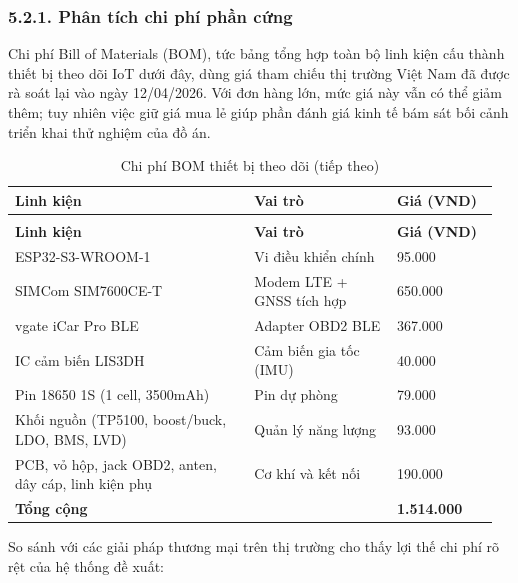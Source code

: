 \documentclass[a4paper]{extarticle}
\newcommand{\thesissettableid}[2]{%
  \renewcommand{\thetable}{#1}%
  \renewcommand{\theHtable}{#2}%
}
\begin{document}
\subsubsection{5.2.1. Phân tích chi phí phần
cứng}\label{521-phuxe2n-tuxedch-chi-phuxed-phux1ea7n-cux1ee9ng}

Chi phí Bill of Materials (BOM), tức bảng tổng hợp toàn bộ linh kiện cấu
thành thiết bị theo dõi IoT dưới đây, dùng
giá tham chiếu thị trường Việt Nam đã được rà soát lại vào ngày
12/04/2026. Với đơn hàng lớn, mức giá này vẫn có thể giảm thêm; tuy
nhiên việc giữ giá mua lẻ giúp phần đánh giá kinh tế bám sát bối cảnh
triển khai thử nghiệm của đồ án.


{\thesissettableid{5.4}{tab-ch5-chi-phi-bom-thiet-bi-tracker}
\def\LTcaptype{table}
\begin{longtable}{|L{0.479\linewidth}|L{0.282\linewidth}|L{0.204\linewidth}|}
\caption{Chi phí BOM thiết bị theo dõi}\label{tab:ch5-chi-phi-bom-thiet-bi-tracker}\\
\hline \textbf{Linh kiện} & \textbf{Vai trò} & \textbf{Giá (VND)} \\
\hline
\endfirsthead
\caption[]{Chi phí BOM thiết bị theo dõi (tiếp theo)}\\
\hline \textbf{Linh kiện} & \textbf{Vai trò} & \textbf{Giá (VND)} \\
\hline
\endhead
\hline
\endfoot
\endlastfoot
ESP32-S3-WROOM-1 & Vi điều khiển chính & 95.000 \\\hline
SIMCom SIM7600CE-T & Modem LTE + GNSS tích hợp & 650.000 \\\hline
vgate iCar Pro BLE & Adapter OBD2 BLE & 367.000 \\\hline
IC cảm biến LIS3DH & Cảm biến gia tốc (IMU) & 40.000 \\\hline
Pin 18650 1S (1 cell, 3500mAh) & Pin dự phòng & 79.000 \\\hline
Khối nguồn (TP5100, boost/buck, LDO, BMS, LVD) & Quản lý năng lượng &
93.000 \\\hline
PCB, vỏ hộp, jack OBD2, anten, dây cáp, linh kiện phụ & Cơ khí và kết nối &
190.000 \\\hline
\textbf{Tổng cộng} & & \textbf{1.514.000} \\\hline
\end{longtable}
}


So sánh với các giải pháp thương mại trên thị trường cho thấy lợi thế
chi phí rõ rệt của hệ thống đề xuất:
\end{document}
